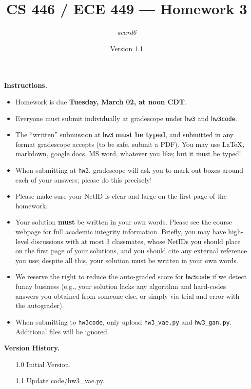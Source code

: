 \documentclass{article}
\title{CS 446 / ECE 449 --- Homework 3}
\author{\emph{acard6}}
\date{Version 1.1}
\theoremstyle{definition}
\theoremstyle{remark}
\begin{document}
	\maketitle
	
	\noindent\textbf{Instructions.}
	\begin{itemize}
		\item
		Homework is due \textbf{\color{red}Tuesday, March 02, at noon CDT}.
		
		\item
		Everyone must submit individually at gradescope under \texttt{hw3} and \texttt{hw3code}.
		
		\item
		The ``written'' submission at \texttt{hw3} \textbf{must be typed}, and submitted in
		any format gradescope accepts (to be safe, submit a PDF).  You may use \LaTeX, markdown,
		google docs, MS word, whatever you like; but it must be typed!
		
		\item
		When submitting at \texttt{hw3}, gradescope will ask you to mark out boxes
		around each of your answers; please do this precisely!
		
		\item
		Please make sure your NetID is clear and large on the first page of the homework.
		
		\item
		Your solution \textbf{must} be written in your own words.
		Please see the course webpage for full academic integrity information.
		Briefly, you may have high-level discussions with at most 3 classmates,
		whose NetIDs you should place on the first page of your solutions,
		and you should cite any external reference you use; despite all this,
		your solution must be written in your own words.
		
		\item
		We reserve the right to reduce the auto-graded score for
		\texttt{hw3code} if we detect funny business (e.g., your solution
		lacks any algorithm and hard-codes answers you obtained from
		someone else, or simply via trial-and-error with the autograder).
		
		\item
		When submitting to \texttt{hw3code}, only upload \texttt{hw3\_vae.py} and \texttt{hw3\_gan.py}. Additional files will be ignored.
		
	\end{itemize}
	
	\noindent\textbf{Version History.}
	\begin{enumerate}[leftmargin=3\parindent]
		\item[1.0]
		Initial Version.
		\item[1.1]
		Update code/hw3\_vae.py.
	\end{enumerate}
	
\end{document}
